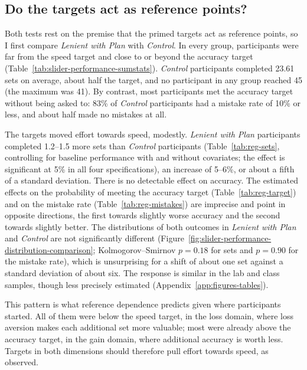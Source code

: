 \documentclass[12pt, letterpaper]{article}
\newcommand{\CtrlName}{Control}
\newcommand{\LPName}{Lenient with Plan}
\newcommand{\Ctrl}{\textit{\CtrlName}}
\newcommand{\LP}{\textit{\LPName}}
\begin{document}
\subsection{Do the targets act as reference points?}

Both tests rest on the premise that the primed targets act as reference points, so I first compare \LP{} with \Ctrl{}. In every group, participants were far from the speed target and close to or beyond the accuracy target (Table~\ref{tab:slider-performance-sumstats}). \Ctrl{} participants completed 23.61 sets on average, about half the target, and no participant in any group reached 45 (the maximum was 41). By contrast, most participants met the accuracy target without being asked to: 83\% of \Ctrl{} participants had a mistake rate of 10\% or less, and about half made no mistakes at all.%

The targets moved effort towards speed, modestly. \LP{} participants completed 1.2--1.5 more sets than \Ctrl{} participants (Table~\ref{tab:reg-sets}, controlling for baseline performance with and without covariates; the effect is significant at 5\% in all four specifications), an increase of 5--6\%, or about a fifth of a standard deviation. There is no detectable effect on accuracy. The estimated effects on the probability of meeting the accuracy target (Table~\ref{tab:reg-target}) and on the mistake rate (Table~\ref{tab:reg-mistakes}) are imprecise and point in opposite directions, the first towards slightly worse accuracy and the second towards slightly better. The distributions of both outcomes in \LP{} and \Ctrl{} are not significantly different (Figure~\ref{fig:slider-performance-distribution-comparison}; Kolmogorov--Smirnov $p = 0.18$ for sets and $p = 0.90$ for the mistake rate), which is unsurprising for a shift of about one set against a standard deviation of about six. The response is similar in the lab and class samples, though less precisely estimated (Appendix~\ref{app:figures-tables}).

This pattern is what reference dependence predicts given where participants started. All of them were below the speed target, in the loss domain, where loss aversion makes each additional set more valuable; most were already above the accuracy target, in the gain domain, where additional accuracy is worth less. Targets in both dimensions should therefore pull effort towards speed, as observed.
\end{document}
